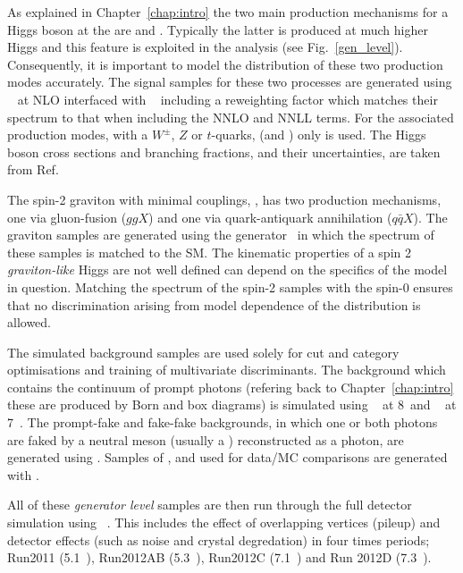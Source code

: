 As explained in Chapter~\ref{chap:intro} the two main production mechanisms for a \SM Higgs boson at the \LHC are \ggH and \VBF. Typically the latter is produced at much higher Higgs \pT and this feature is exploited in the analysis (see Fig.~\ref{gen_level}). Consequently, it is important to model the \pT distribution of these two production modes accurately. The signal samples for these two processes are generated using \POWHEG~\cite{powheg1,powheg2} at NLO interfaced with \PYTHIA~\cite{pythia} including a reweighting factor which matches their \pT spectrum to that when including the NNLO and NNLL terms. For the associated production modes, with a $W^{\pm}$, $Z$ or $t$-quarks, (\VH and \ttH) only \PYTHIA is used. The \SM Higgs boson cross sections and branching fractions, and their uncertainties, are taken from Ref.~\cite{LHCHiggsCrossSectionWorkingGroup3}

The spin-2 graviton with minimal couplings, \graviton, has two production mechanisms, one via gluon-fusion ($ggX$) and one via quark-antiquark annihilation ($q\bar{q}X$). The graviton samples are generated using the \JHU generator~\cite{jhu} in which the \pT spectrum of these samples is matched to the SM. The kinematic properties of a spin 2 \textit{graviton-like} Higgs are not well defined can depend on the specifics of the model in question. Matching the \pT spectrum of the spin-2 samples with the \SM spin-0 ensures that no discrimination arising from model dependence of the \pT distribution is allowed. 

The simulated background samples are used solely for cut and category optimisations and training of multivariate discriminants. The background which contains the \QCD continuum of prompt photons (refering back to Chapter~\ref{chap:intro} these are produced by Born and box diagrams) is simulated using \SHERPA~\cite{sherpa} at 8~\TeV and \MADGRAPH~\cite{madgraph} at 7~\TeV. The prompt-fake and fake-fake backgrounds, in which one or both photons are faked by a neutral meson (usually a \pizero) reconstructed as a photon, are generated using \PYTHIA. Samples of \Zee, \Zmumu and \Zmumugamma used for data/MC comparisons are generated with \POWHEG.

All of these \emph{generator level} samples are then run through the full \CMS detector simulation using \GEANT~\cite{geant}. This includes the effect of overlapping vertices (pileup) and detector effects (such as noise and crystal degredation) in four times periods; Run2011 (5.1~\fb), Run2012AB (5.3~\fb), Run2012C (7.1~\fb) and Run 2012D (7.3~\fb).


